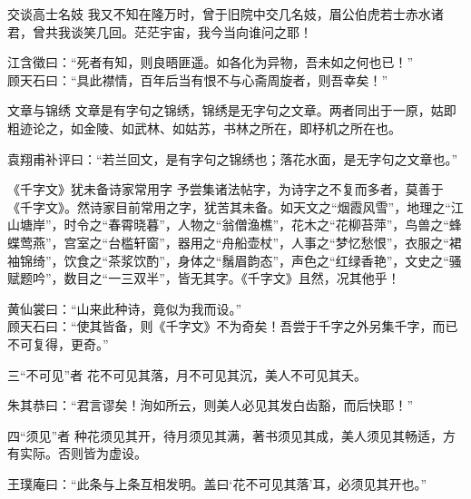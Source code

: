 \begin{yulu}{交谈高士名妓}
我又不知在隆万时，曾于旧院中交几名妓，眉公伯虎若士赤水诸君，曾共我谈笑几回。茫茫宇宙，我今当向谁问之耶！
\begin{comments}
江含徵曰：“死者有知，则良晤匪遥。如各化为异物，吾未如之何也已！” \\
顾天石曰：“具此襟情，百年后当有恨不与心斋周旋者，则吾幸矣！”
\end{comments}
\end{yulu}

\begin{yulu}{文章与锦绣}
文章是有字句之锦绣，锦绣是无字句之文章。两者同出于一原，姑即粗迹论之，如金陵、如武林、如姑苏，书林之所在，即杼机之所在也。
\begin{comments}
袁翔甫补评曰：“若兰回文，是有字句之锦绣也；落花水面，是无字句之文章也。”
\end{comments}
\end{yulu}

\begin{yulu}{《千字文》犹未备诗家常用字}
予尝集诸法帖字，为诗字之不复而多者，莫善于《千字文》。然诗家目前常用之字，犹苦其未备。如天文之“烟霞风雪”，地理之“江山塘岸”，时令之“春霄晓暮”，人物之“翁僧渔樵”，花木之“花柳苔萍”，鸟兽之“蜂蝶莺燕”，宫室之“台槛轩窗”，器用之“舟船壶杖”，人事之“梦忆愁恨”，衣服之“裙袖锦绮”，饮食之“茶浆饮酌”，身体之“鬚眉韵态”，声色之“红绿香艳”，文史之“骚赋题吟”，数目之“一三双半”，皆无其字。《千字文》且然，况其他乎！
\begin{comments}
黄仙裳曰：“山来此种诗，竟似为我而设。” \\
顾天石曰：“使其皆备，则《千字文》不为奇矣！吾尝于千字之外另集千字，而已不可复得，更奇。”
\end{comments}
\end{yulu}

\begin{yulu}{三“不可见”者}
花不可见其落，月不可见其沉，美人不可见其夭。
\begin{comments}
朱其恭曰：“君言谬矣！洵如所云，则美人必见其发白齿豁，而后快耶！”
\end{comments}
\end{yulu}

\begin{yulu}{四“须见”者}
种花须见其开，待月须见其满，著书须见其成，美人须见其畅适，方有实际。否则皆为虚设。
\begin{comments}
王璞庵曰：“此条与上条互相发明。盖曰‘花不可见其落’耳，必须见其开也。”
\end{comments}
\end{yulu}

